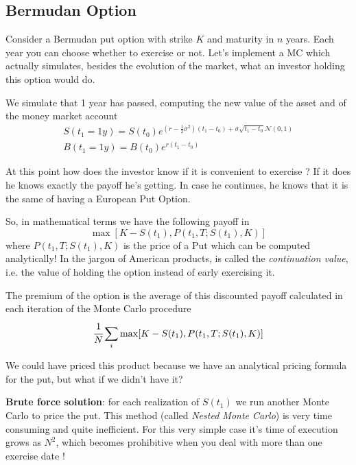 \documentclass[12pt,a4paper]{article}
\begin{document}
\subsection{Bermudan Option}
Consider a Bermudan put option with strike $K$ and maturity in $n$ years. Each year you can choose whether to exercise or not.
Let's implement a MC which actually simulates, besides the evolution of the market, what an investor holding this option would do. 

We simulate that 1 year has passed, computing the new value of the asset and of the money market account
\begin{equation}
	\begin{gathered}
		S(t_1=1y) = S(t_0)e^{(r-\frac{1}{2}\sigma^2)(t_1-t_0)+\sigma\sqrt{t_1-t_0}\mathcal{N}(0,1)} \\
		B(t_1=1y)=B(t_0)e^{r(t_1-t_0)}
	\end{gathered}
\end{equation}

At this point how does the investor know if it is convenient to exercise ? 
If it does he knows exactly the payoff he's getting. In case he continues, he knows that it is the same of having a European Put Option.

So, in mathematical terms we have the following payoff in 
\begin{equation}
	\max[K-S(t_1), P(t_1,T;S(t_1),K)]
\end{equation}
where $P(t_1,T;S(t_1),K)$ is the price of a Put which can be computed analytically! In the jargon of American products, 
is called the \emph{continuation value}, i.e. the value of holding the option instead of early exercising it.

The premium of the option is the average of this discounted payoff calculated in each iteration of the Monte Carlo procedure
\begin{equation}
	\cfrac{1}{N}\sum_i\max[K-S(t_1), P(t_1,T;S(t_1),K)]
\end{equation}

We could have priced this product because we have an analytical pricing formula for the put, but what if we didn't have it?

\textbf{Brute force solution}: for each realization of $S(t_1)$ we run another Monte Carlo to price the put. This method (called \emph{Nested Monte Carlo}) is very time consuming and quite inefficient. For this very simple case it's time of execution grows as $N^2$, which becomes prohibitive when you deal with more than one exercise date !
\end{document}
